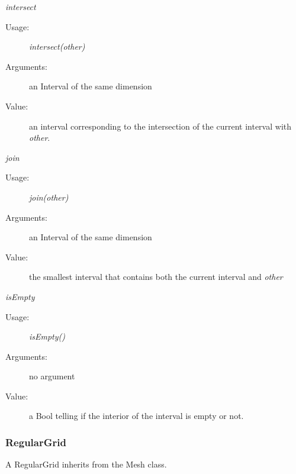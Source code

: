 \begin{description}
\begin{description}
\item \textit{intersect}
\begin{description}
\item[Usage:] \textit{intersect(other)}
\item[Arguments:] an Interval of the same dimension
\item[Value:] an interval corresponding to the intersection of the current interval with \textit{other}.
\end{description}
\bigskip

\item \textit{join}
\begin{description}
\item[Usage:] \textit{join(other)}
\item[Arguments:] an Interval of the same dimension
\item[Value:] the smallest interval that contains both the current interval and \textit{other}
\end{description}
\bigskip

\item \textit{isEmpty}
\begin{description}
\item[Usage:] \textit{isEmpty()}
\item[Arguments:] no argument
\item[Value:] a Bool telling if the interior of the interval is empty or not.
\end{description}

\end{description}

\end{description}





\newpage
\subsubsection{RegularGrid}

A RegularGrid inherits from the Mesh class.

